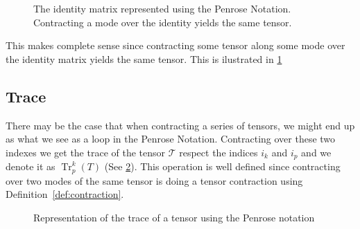 \documentclass[11pt,a4paper,openright,oneside]{book}
\numberwithin{equation}{section}
\newcommand{\defref}[1]{Definition~\ref{#1}}
\newcommand{\figref}[1]{\cref{#1}}
\DeclareMathOperator{\Tr}{Tr}
\begin{document}
\begin{figure}[h]
    \caption{
        The identity matrix represented using the Penrose Notation. Contracting a mode over the identity yields the same
        tensor.
    }
    \label{fig:pen_identity}
\end{figure}

This makes complete sense since contracting some tensor along some mode over the identity matrix yields the same tensor.
This is ilustrated in \figref{fig:pen_identity}


\subsection*{Trace}

There may be the case that when contracting a series of tensors, we might end up as what
we see as a loop in the Penrose Notation. Contracting over these two indexes we get the trace
of the tensor $\mathcal{T}$ respect the indices $i_k$ and $i_p$ and we denote it as $\Tr^k_p(T)$ (See \figref{fig:trace}).
This operation is well defined since contracting over two modes of the same tensor is doing a tensor contraction
using \defref{def:contraction}.

\begin{figure}[h]
\centering

    \begin{minipage}{0.2\textwidth}
\end{minipage}
\begin{minipage}{0.225\textwidth}
\end{minipage}
\begin{minipage}{0.2\textwidth}
\end{minipage}


\caption{
    Representation of the trace of a tensor using the Penrose notation
}
\label{fig:trace}
\end{figure}
\end{document}
